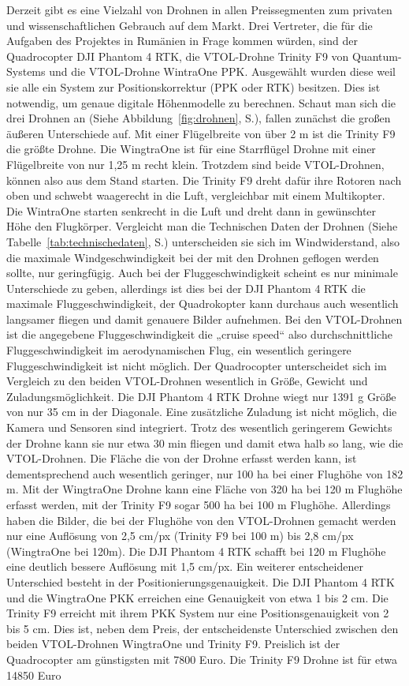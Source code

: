 Derzeit gibt es eine Vielzahl von Drohnen in allen Preissegmenten zum privaten und wissenschaftlichen Gebrauch auf dem Markt. Drei Vertreter, die für die Aufgaben des Projektes in Rumänien in Frage kommen würden, sind der Quadrocopter DJI Phantom 4 RTK, die VTOL-Drohne Trinity F9 von Quantum-Systems und die VTOL-Drohne WintraOne PPK. Ausgewählt wurden diese weil sie alle ein System zur Positionskorrektur (PPK oder RTK) besitzen. Dies ist notwendig, um genaue digitale Höhenmodelle zu berechnen. Schaut man sich die drei Drohnen an (Siehe Abbildung~\ref{fig:drohnen}, S.\pageref{fig:drohnen}), fallen zunächst die großen äußeren Unterschiede auf. Mit einer Flügelbreite von über 2 m ist die Trinity F9 die größte Drohne. Die WingtraOne ist für eine Starrflügel Drohne mit einer Flügelbreite von nur 1,25 m recht klein. Trotzdem sind beide VTOL-Drohnen, können also aus dem Stand starten. Die Trinity F9 dreht dafür ihre Rotoren nach oben und schwebt waagerecht in die Luft, vergleichbar mit einem Multikopter. Die WintraOne starten senkrecht in die Luft und dreht dann in gewünschter Höhe den Flugkörper. Vergleicht man die Technischen Daten der Drohnen (Siehe Tabelle~\ref{tab:technischedaten}, S.\pageref{tab:technischedaten}) unterscheiden sie sich im Windwiderstand, also die maximale Windgeschwindigkeit bei der mit den Drohnen geflogen werden sollte, nur geringfügig. Auch bei der Fluggeschwindigkeit scheint es nur minimale Unterschiede zu geben, allerdings ist dies bei der DJI Phantom 4 RTK die maximale Fluggeschwindigkeit, der Quadrokopter kann durchaus auch wesentlich langsamer fliegen und damit genauere Bilder aufnehmen. Bei den VTOL-Drohnen ist die angegebene Fluggeschwindigkeit die „cruise speed“ also durchschnittliche Fluggeschwindigkeit im aerodynamischen Flug, ein wesentlich geringere Fluggeschwindigkeit ist nicht möglich. Der Quadrocopter unterscheidet sich im Vergleich zu den beiden VTOL-Drohnen wesentlich in Größe, Gewicht und Zuladungsmöglichkeit. Die DJI Phantom 4 RTK Drohne wiegt nur 1391 g Größe von nur 35 cm in der Diagonale. Eine zusätzliche Zuladung ist nicht möglich, die Kamera und Sensoren sind integriert. Trotz des wesentlich geringerem Gewichts der Drohne kann sie nur etwa 30 min fliegen und damit etwa halb so lang, wie die VTOL-Drohnen. Die Fläche die von der Drohne erfasst werden kann, ist dementsprechend auch wesentlich geringer, nur 100 ha bei einer Flughöhe von 182 m. Mit der WingtraOne Drohne kann eine Fläche von 320 ha bei 120 m Flughöhe erfasst werden, mit der Trinity F9 sogar 500 ha bei 100 m Flughöhe. Allerdings haben die Bilder, die bei der Flughöhe von den VTOL-Drohnen gemacht werden nur eine Auflösung von 2,5 cm/px (Trinity F9 bei 100 m) bis 2,8 cm/px (WingtraOne bei 120m). Die DJI Phantom 4 RTK schafft bei 120 m Flughöhe eine deutlich bessere Auflösung mit 1,5 cm/px. Ein weiterer entscheidener Unterschied besteht in der Positionierungsgenauigkeit. Die DJI Phantom 4 RTK und die WingtraOne PKK erreichen eine Genauigkeit von etwa 1 bis 2 cm. Die Trinity F9 erreicht mit ihrem PKK System nur eine Positionsgenauigkeit von 2 bis 5 cm. Dies ist, neben dem Preis, der entscheidenste Unterschied zwischen den beiden VTOL-Drohnen WingtraOne und Trinity F9. Preislich ist der Quadrocopter am günstigsten mit 7800 Euro. Die Trinity F9 Drohne ist für etwa 14850 Euro 